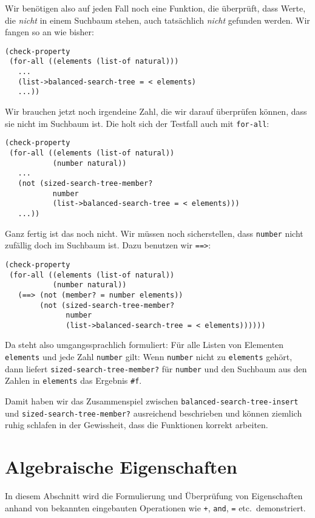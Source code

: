 %
Wir benötigen also auf jeden Fall noch eine Funktion, die überprüft,
dass Werte, die \emph{nicht} in einem Suchbaum stehen, auch
tatsächlich \emph{nicht} gefunden werden.  Wir fangen so an wie bisher:
%
\begin{lstlisting}
(check-property
 (for-all ((elements (list-of natural)))
   ...
   (list->balanced-search-tree = < elements)
   ...))
\end{lstlisting}
%
Wir brauchen jetzt noch irgendeine Zahl, die wir darauf überprüfen
können, dass sie nicht im Suchbaum ist.  Die holt sich der Testfall
auch mit \lstinline{for-all}:
%
\begin{lstlisting}
(check-property
 (for-all ((elements (list-of natural))
           (number natural))
   ...
   (not (sized-search-tree-member?
           number
           (list->balanced-search-tree = < elements)))
   ...))
\end{lstlisting}
%
Ganz fertig ist das noch nicht.  Wir müssen noch sicherstellen, dass
\lstinline{number} nicht zufällig doch im Suchbaum ist.  Dazu benutzen
wir \lstinline{==>}:
%
\begin{lstlisting}
(check-property
 (for-all ((elements (list-of natural))
           (number natural))
   (==> (not (member? = number elements))
        (not (sized-search-tree-member?
              number
              (list->balanced-search-tree = < elements))))))
\end{lstlisting}
%
Da steht also umgangssprachlich formuliert: Für alle Listen von
Elementen \lstinline{elements} und jede Zahl \lstinline{number} gilt:
Wenn \lstinline{number} nicht zu \lstinline{elements} gehört, dann
liefert \lstinline{sized-search-tree-member?} für \lstinline{number}
und den Suchbaum aus den Zahlen in \lstinline{elements} das Ergebnis
\lstinline{#f}.

Damit haben wir das Zusammenspiel zwischen
\lstinline{balanced-search-tree-insert} und
\lstinline{sized-search-tree-member?} ausreichend beschrieben und
können ziemlich ruhig schlafen in der Gewissheit, dass die Funktionen
korrekt arbeiten.

\section{Algebraische Eigenschaften}
\label{sec:algebraische-eigenschaften}

In diesem Abschnitt wird die Formulierung und Überprüfung von
Eigenschaften anhand von bekannten eingebauten Operationen wie
\lstinline{+}, \lstinline{and}, \lstinline{=} etc.\ demonstriert.

